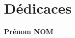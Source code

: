 \chapter*{D\'edicaces}

\begin{center}
\begin{minipage}[c]{1\columnwidth}
{\large
\vskip1cm
\centering
{}
}
\end{minipage}
\end{center}

\vskip1.5cm
\begin{flushright}\LARGE
\bf{Pr\'enom NOM}
\end{flushright}
